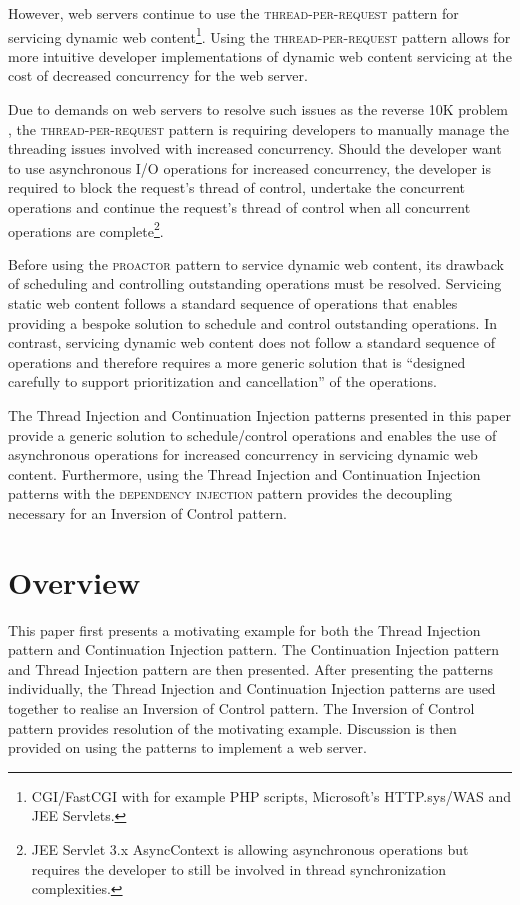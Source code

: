 \documentclass[prodmode]{style/acmlarge}
\begin{document}
However, web servers continue to use the \textsc{thread-per-request} pattern for
servicing dynamic web content\footnote{CGI/FastCGI with for example PHP scripts,
Microsoft's HTTP.sys/WAS and JEE Servlets.}.  Using the
\textsc{thread-per-request} pattern allows for more intuitive developer
implementations of dynamic web content servicing at the cost of decreased
concurrency for the web server.

Due to demands on web servers to resolve such issues as the reverse 10K problem
\cite{reverse-ten-k-problem}, the \textsc{thread-per-request} pattern is
requiring developers to manually manage the threading issues involved with
increased concurrency.  Should the developer want to use asynchronous I/O
operations for increased concurrency, the developer is required to block the
request's thread of control, undertake the concurrent operations and continue
the request's thread of control when all concurrent operations are
complete\footnote{JEE Servlet 3.x AsyncContext is allowing asynchronous
operations but requires the developer to still be involved in thread
synchronization complexities.}.

Before using the \textsc{proactor} pattern to service dynamic web content, its
drawback of scheduling and controlling outstanding operations \cite[p.
8]{proactor} must be resolved.  Servicing static web content follows a standard
sequence of operations that enables providing a bespoke solution to schedule and
control outstanding operations.  In contrast, servicing dynamic web content does
not follow a standard sequence of operations and therefore requires a more
generic solution that is ``designed carefully to support prioritization and
cancellation'' \cite[p. 8]{proactor} of the operations.

The Thread Injection and Continuation Injection patterns presented in this paper
provide a generic solution to schedule/control operations and enables the use
of asynchronous operations for increased concurrency in servicing dynamic web
content.  Furthermore, using the Thread Injection and Continuation Injection
patterns with the \textsc{dependency injection} pattern \cite{ioc} provides the
decoupling necessary for an Inversion of Control pattern.


\section{Overview}

This paper first presents a motivating example for both the Thread Injection
pattern and Continuation Injection pattern.  The Continuation Injection pattern
and Thread Injection pattern are then presented.  After presenting the patterns
individually, the Thread Injection and Continuation Injection patterns are used
together to realise an Inversion of Control pattern.  The Inversion of Control
pattern provides resolution of the motivating example.  Discussion is then
provided on using the patterns to implement a web server.
\end{document}
